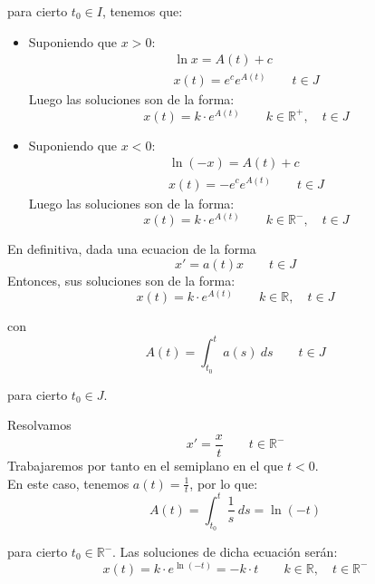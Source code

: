 para cierto $t_0 \in I$, tenemos que:
\begin{itemize}
    \item Suponiendo que $x>0$:
        \begin{gather*}
            \ln x = A(t) + c \\
            x(t) = e^c e^{A(t)} \qquad t\in J
        \end{gather*}
        Luego las soluciones son de la forma:
        \begin{equation*}
            x(t) = k\cdot e^{A(t)} \qquad k\in \mathbb{R}^+, \quad t\in J
        \end{equation*}
    \item Suponiendo que $x<0$:
        \begin{gather*}
            \ln (-x) = A(t) + c \\
            x(t) = -e^c e^{A(t)} \qquad t\in J
        \end{gather*}
        Luego las soluciones son de la forma:
        \begin{equation*}
            x(t) = k\cdot e^{A(t)} \qquad k\in \mathbb{R}^-, \quad t\in J
        \end{equation*}
\end{itemize}
En definitiva, dada una ecuacion de la forma
\begin{equation*}
    x' = a(t)x\qquad t\in J
\end{equation*}
Entonces, sus soluciones son de la forma:
\begin{equation*}
    x(t) = k\cdot e^{A(t)} \qquad k\in \mathbb{R}, \quad t\in J
\end{equation*}

con
\begin{equation*}
    A(t) = \int_{t_0}^{t} a(s)~ds \qquad t\in J
\end{equation*}

para cierto $t_0\in J$.

\begin{ejemplo}
    Resolvamos
    \begin{equation*}
        x' = \dfrac{x}{t} \qquad t\in \mathbb{R}^-
    \end{equation*}
    Trabajaremos por tanto en el semiplano en el que $t<0$.\\

    En este caso, tenemos $a(t) = \frac{1}{t}$, por lo que:
    \begin{equation*}
        A(t) = \int_{t_0}^{t} \dfrac{1}{s}~ds  = \ln(-t)
    \end{equation*}

    para cierto $t_0\in \mathbb{R}^-$. Las soluciones de dicha ecuación serán:
    \begin{equation*}
        x(t) = k\cdot e^{\ln(-t)} = -k\cdot t \qquad k\in \mathbb{R}, \quad t\in \mathbb{R}^-
    \end{equation*}
\end{ejemplo}

